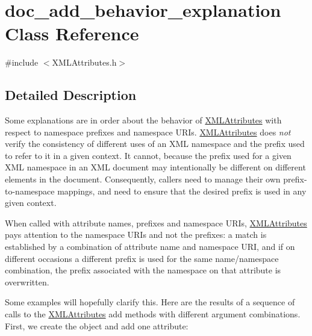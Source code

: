 \hypertarget{classdoc__add__behavior__explanation}{}\section{doc\+\_\+add\+\_\+behavior\+\_\+explanation Class Reference}
\label{classdoc__add__behavior__explanation}


{\ttfamily \#include $<$X\+M\+L\+Attributes.\+h$>$}



\subsection{Detailed Description}
\begin{DoxyParagraph}{}
Some explanations are in order about the behavior of \hyperlink{class_x_m_l_attributes}{X\+M\+L\+Attributes} with respect to namespace prefixes and namespace U\+R\+Is. \hyperlink{class_x_m_l_attributes}{X\+M\+L\+Attributes} does {\itshape not} verify the consistency of different uses of an X\+ML namespace and the prefix used to refer to it in a given context. It cannot, because the prefix used for a given X\+ML namespace in an X\+ML document may intentionally be different on different elements in the document. Consequently, callers need to manage their own prefix-\/to-\/namespace mappings, and need to ensure that the desired prefix is used in any given context.
\end{DoxyParagraph}
When called with attribute names, prefixes and namespace U\+R\+Is, \hyperlink{class_x_m_l_attributes}{X\+M\+L\+Attributes} pays attention to the namespace U\+R\+Is and not the prefixes\+: a match is established by a combination of attribute name and namespace U\+RI, and if on different occasions a different prefix is used for the same name/namespace combination, the prefix associated with the namespace on that attribute is overwritten.

Some examples will hopefully clarify this. Here are the results of a sequence of calls to the \hyperlink{class_x_m_l_attributes}{X\+M\+L\+Attributes} {\ttfamily add} methods with different argument combinations. First, we create the object and add one attribute\+:



